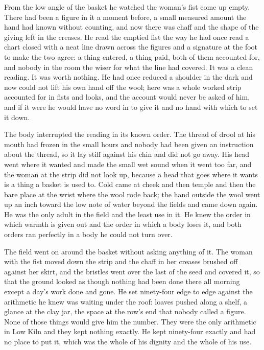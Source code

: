 From the low angle of the basket he watched the woman's fist come up empty. There had been a figure in it a moment before, a small measured amount the hand had known without counting, and now there was chaff and the shape of the giving left in the creases. He read the emptied fist the way he had once read a chart closed with a neat line drawn across the figures and a signature at the foot to make the two agree: a thing entered, a thing paid, both of them accounted for, and nobody in the room the wiser for what the line had covered. It was a clean reading. It was worth nothing. He had once reduced a shoulder in the dark and now could not lift his own hand off the wool; here was a whole worked strip accounted for in fists and looks, and the account would never be asked of him, and if it were he would have no word in  to give it and no hand with which to set it down.

The body interrupted the reading in its known order. The thread of drool at his mouth had frozen in the small hours and nobody had been given an instruction about the thread, so it lay stiff against his chin and did not go away. His head went where it wanted and made the small wet sound when it went too far, and the woman at the strip did not look up, because a head that goes where it wants is a thing a basket is used to. Cold came at cheek and then temple and then the bare place at the wrist where the wool rode back; the hand outside the wool went up an inch toward the low note of water beyond the fields and came down again. He was the only adult in the field and the least use in it. He knew the order in which warmth is given out and the order in which a body loses it, and both orders ran perfectly in a body he could not turn over.

The field went on around the basket without asking anything of it. The woman with the fist moved down the strip and the chaff in her creases brushed off against her skirt, and the bristles went over the last of the seed and covered it, so that the ground looked as though nothing had been done there all morning except a day's work done and gone. He set ninety-four edge to edge against the arithmetic he knew was waiting under the roof: loaves pushed along a shelf, a glance at the clay jar, the space at the row's end that nobody called a figure. None of those things would give him the number. They were the only arithmetic in Low Kiln and they kept nothing exactly. He kept ninety-four exactly and had no place to put it, which was the whole of his dignity and the whole of his use.

